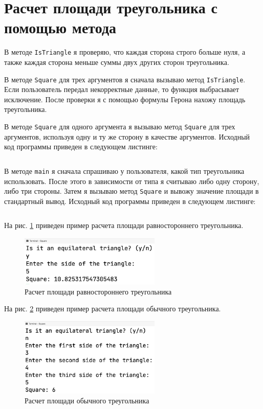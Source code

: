 \documentclass[a4paper,14pt]{extarticle}
\numberwithin{figure}{section}
\begin{document}
\section{Расчет площади треугольника с помощью метода}

В методе \texttt{IsTriangle} я проверяю, что каждая сторона строго больше нуля, а также каждая сторона меньше суммы двух других сторон треугольника.

В методе \texttt{Square} для трех аргументов я сначала вызываю метод \texttt{IsTriangle}. Если пользователь передал некорректные данные, то функция выбрасывает исключение. После проверки я с помощью формулы Герона нахожу площадь треугольника.

В методе \texttt{Square} для одного аргумента я вызываю метод \texttt{Square} для трех аргументов, используя одну и ту же сторону в качестве аргументов. Исходный код программы приведен в следующем листинге:

\inputminted{csharp}{../Square/Square/Operation.cs}

В методе \texttt{main} я сначала спрашиваю у пользователя, какой тип треугольника использовать. После этого в зависимости от типа я считываю либо одну сторону, либо три стороны. Затем я вызываю метод \texttt{Square} и вывожу значение площади в стандартный вывод. Исходный код программы приведен в следующем листинге:

\inputminted{csharp}{../Square/Square/Program.cs}

На рис. \ref{fig:task-4-1} приведен пример расчета площади равностороннего треугольника.

\begin{figure}[H]
    \centering
    \includegraphics[width=0.6\textwidth]{images/task-4-1.png}
    \caption{Расчет площади равностороннего треугольника}
    \label{fig:task-4-1}
\end{figure}

На рис. \ref{fig:task-4-2} приведен пример расчета площади обычного треугольника.

\begin{figure}[H]
    \centering
    \includegraphics[width=0.6\textwidth]{images/task-4-2.png}
    \caption{Расчет площади обычного треугольника}
    \label{fig:task-4-2}
\end{figure}
\end{document}
